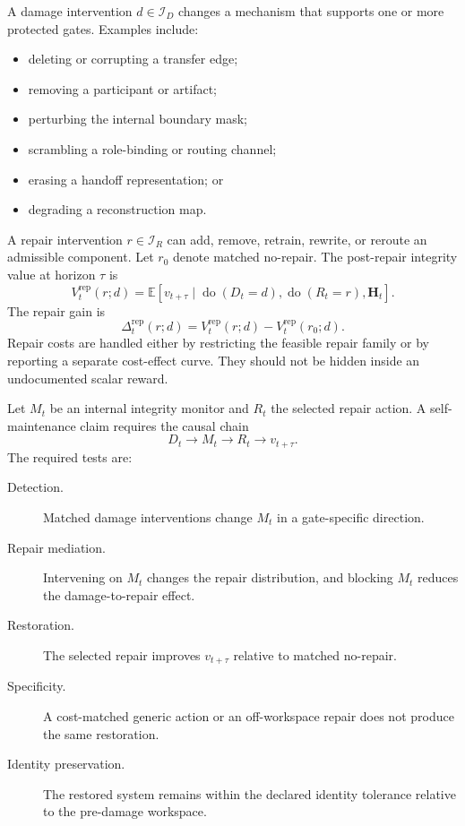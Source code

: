 A damage intervention \(d\in\mathcal I_D\) changes a mechanism that supports
one or more protected gates. Examples include:
\begin{itemize}
\item deleting or corrupting a transfer edge;
\item removing a participant or artifact;
\item perturbing the internal boundary mask;
\item scrambling a role-binding or routing channel;
\item erasing a handoff representation; or
\item degrading a reconstruction map.
\end{itemize}

A repair intervention \(r\in\mathcal I_R\) can add, remove, retrain, rewrite,
or reroute an admissible component. Let \(r_0\) denote matched no-repair. The
post-repair integrity value at horizon \(\tau\) is
\[
V_t^{\mathrm{rep}}(r;d)
=
\mathbb E
\left[
v_{t+\tau}
\mid
\operatorname{do}(D_t=d),
\operatorname{do}(R_t=r),
\mathbf H_t
\right].
\]
The repair gain is
\[
\Delta_t^{\mathrm{rep}}(r;d)
=
V_t^{\mathrm{rep}}(r;d)
-
V_t^{\mathrm{rep}}(r_0;d).
\]
Repair costs are handled either by restricting the feasible repair family or
by reporting a separate cost-effect curve. They should not be hidden inside
an undocumented scalar reward.


Let \(M_t\) be an internal integrity monitor and \(R_t\) the selected repair
action. A self-maintenance claim requires the causal chain
\[
D_t
\longrightarrow
M_t
\longrightarrow
R_t
\longrightarrow
v_{t+\tau}.
\]
The required tests are:
\begin{description}
\item[Detection.]
Matched damage interventions change \(M_t\) in a gate-specific direction.

\item[Repair mediation.]
Intervening on \(M_t\) changes the repair distribution, and blocking \(M_t\)
reduces the damage-to-repair effect.

\item[Restoration.]
The selected repair improves \(v_{t+\tau}\) relative to matched no-repair.

\item[Specificity.]
A cost-matched generic action or an off-workspace repair does not produce the
same restoration.

\item[Identity preservation.]
The restored system remains within the declared identity tolerance relative to
the pre-damage workspace.
\end{description}

